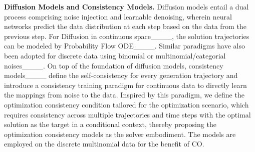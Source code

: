 \textbf{Diffusion Models and Consistency Models.} Diffusion models entail a dual process comprising noise injection and learnable denoising, wherein neural networks predict the data distribution at each step based on the data from the previous step. For Diffusion in continuous space____, the solution trajectories can be modeled by Probability Flow ODE____. Similar paradigms have also been adopted for discrete data using binomial or multinomial/categorial noises____. On top of the foundation of diffusion models, consistency models____ define the self-consistency for every generation trajectory and introduce a consistency training paradigm for continuous data to directly learn the mappings from noise to the data. Inspired by this paradigm, we define the optimization consistency condition tailored for the optimization scenario, which requires consistency across multiple trajectories and time steps with the optimal solution as the target in a conditional context, thereby proposing the optimization consistency models as the solver embodiment. The models are employed on the discrete multinomial data for the benefit of CO.



%
